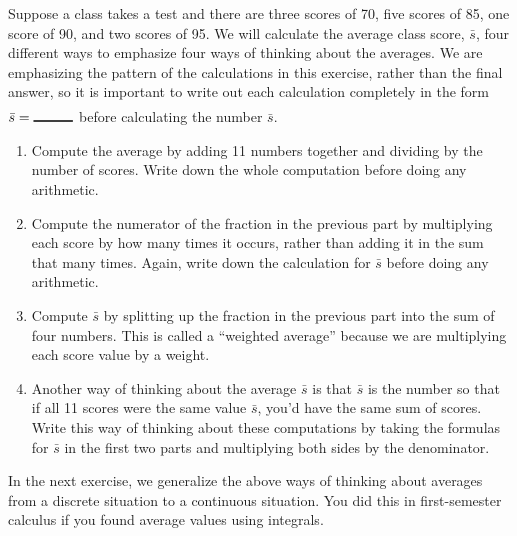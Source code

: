 \begin{problem}\label{average value methods}
  Suppose a class takes a test and there are three scores of 70, five scores of 85, one score of 90, and two scores of 95.  We will calculate the average class score, $\bar s$, four different ways to emphasize four ways of thinking about the averages.  We are emphasizing the pattern of the calculations in this exercise, rather than the final answer, so it is important to write out each calculation completely in the form $\bar s = \blank{1cm}$ before calculating the number $\bar s$.
  \begin{enumerate}
  \item {}%
 Compute the average by adding 11 numbers together and dividing by the number of scores.  Write down the whole computation before doing any arithmetic.
  \item {}%
Compute the numerator of the fraction in the previous part by multiplying each score by how many times it occurs, rather than adding it in the sum that many times.  Again, write down the calculation for $\bar s$ before doing any arithmetic.
  \item {}%
Compute $\bar s$ by splitting up the fraction in the previous part into the sum of four numbers.  This is called a ``weighted average'' because we are multiplying each score value by a weight.
  \item {}%
Another way of thinking about the average $\bar s$ is that $\bar s$ is the number so that if all 11 scores were the same value $\bar s$, you'd have the same sum of scores.  Write this way of thinking about these computations by taking the formulas for $\bar s$ in the first two parts and multiplying both sides by the denominator.
  \end{enumerate}
\end{problem}

In the next exercise, we generalize the above ways of thinking about averages from a discrete situation to a continuous situation.  You did this in first-semester calculus if you found average values using integrals.

